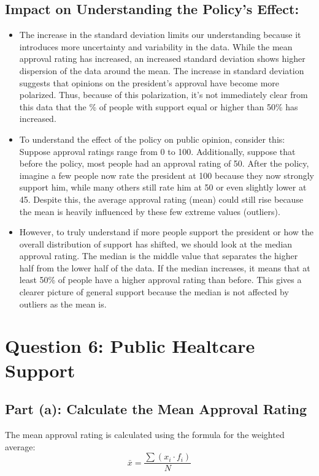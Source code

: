 \documentclass{article}
\begin{document}
\subsection*{Impact on Understanding the Policy's Effect:} 
    \begin{itemize}
        \item The increase in the standard deviation limits our understanding because it introduces more uncertainty and variability in the data. While the mean approval rating has increased, an increased standard deviation shows higher dispersion of the data around the mean. The increase in standard deviation suggests that opinions on the president's approval have become more polarized. Thus, because of this polarization, it's not immediately clear from this data that the \% of people with support equal or higher than 50\% has increased.
        \item To understand the effect of the policy on public opinion, consider this: Suppose approval ratings range from 0 to 100. Additionally, suppose that before the policy, most people had an approval rating of 50. After the policy, imagine a few people now rate the president at 100 because they now strongly support him, while many others still rate him at 50 or even slightly lower at 45. Despite this, the average approval rating (mean) could still rise because the mean is heavily influenced by these few extreme values (outliers). 
        \item However, to truly understand if more people support the president or how the overall distribution of support has shifted, we should look at the median approval rating. The median is the middle value that separates the higher half from the lower half of the data. If the median increases, it means that at least 50\% of people have a higher approval rating than before. This gives a clearer picture of general support because the median is not affected by outliers as the mean is.
    \end{itemize}

\section{Question 6: Public Healtcare Support}

\subsection*{Part (a): Calculate the Mean Approval Rating}
The mean approval rating is calculated using the formula for the weighted average:
\[
\bar{x} = \frac{\sum (x_i \cdot f_i)}{N}
\]
\end{document}
